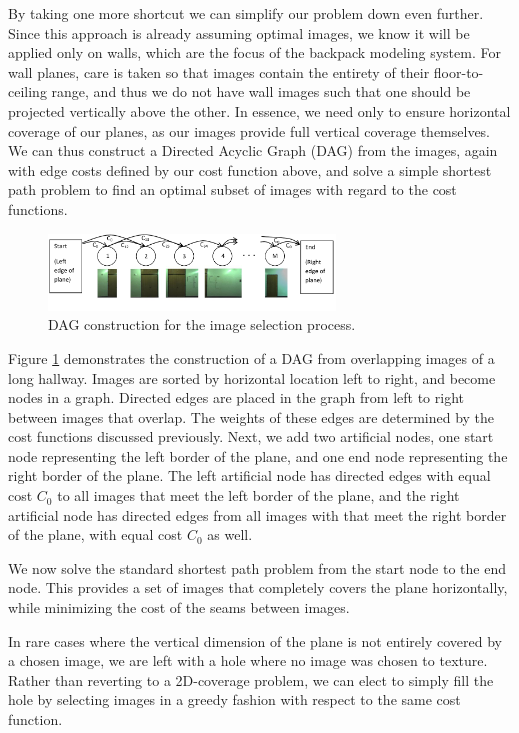 \documentclass[10pt,twocolumn,letterpaper]{article}
\begin{document}
By taking one more shortcut we can simplify our problem down even
further. Since this approach is already assuming optimal images, we
know it will be applied only on walls, which are the focus of the
backpack modeling system. For wall planes, care is taken so that
images contain the entirety of their floor-to-ceiling range, and thus
we do not have wall images such that one should be projected
vertically above the other. In essence, we need only to ensure
horizontal coverage of our planes, as our images provide full vertical
coverage themselves. We can thus construct a Directed Acyclic Graph
(DAG) from the images, again with edge costs defined by our cost
function above, and solve a simple shortest path problem to find an
optimal subset of images with regard to the cost functions.

\begin{figure}
  \centering
  \includegraphics[width=3in]{dagCreation.pdf}
  \caption{DAG construction for the image selection process.}
  \label{fig:dagCreation}
\end{figure}

Figure \ref{fig:dagCreation} demonstrates the construction of a DAG
from overlapping images of a long hallway. Images are sorted by
horizontal location left to right, and become nodes in a
graph. Directed edges are placed in the graph from left to right
between images that overlap. The weights of these edges are determined
by the cost functions discussed previously. Next, we add two
artificial nodes, one start node representing the left border of the
plane, and one end node representing the right border of the
plane. The left artificial node has directed edges with equal cost
$C_0$ to all images that meet the left border of the plane, and the
right artificial node has directed edges from all images with that
meet the right border of the plane, with equal cost $C_0$ as well.

We now solve the standard shortest path problem from the start node to
the end node. This provides a set of images that completely covers the
plane horizontally, while minimizing the cost of the seams between
images.

In rare cases where the vertical dimension of the plane is not
entirely covered by a chosen image, we are left with a hole where no
image was chosen to texture. Rather than reverting to a 2D-coverage
problem, we can elect to simply fill the hole by selecting images in a
greedy fashion with respect to the same cost function.
\end{document}
